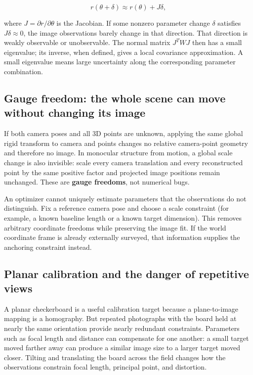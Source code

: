 \[
r(\theta+\delta)\approx r(\theta)+J\delta,
\]

where \(J=\partial r/\partial\theta\) is the Jacobian. If some nonzero parameter change \(\delta\) satisfies \(J\delta\approx0\), the image observations barely change in that direction. That direction is weakly observable or unobservable. The normal matrix \(J^T W J\) then has a small eigenvalue; its inverse, when defined, gives a local covariance approximation. A small eigenvalue means large uncertainty along the corresponding parameter combination.

\subsection{Gauge freedom: the whole scene can move without changing its image}\label{02-foundations-ii-ch036-gauge-freedom-the-whole-scene-can-move-without-changing-its-image}

\hypertarget{02-foundations-ii-ch036-gauge-freedom-the-whole-scene-can-move-without-changing-its-image}{}

If both camera poses and all 3D points are unknown, applying the same global rigid transform to camera and points changes no relative camera-point geometry and therefore no image. In monocular structure from motion, a global scale change is also invisible: scale every camera translation and every reconstructed point by the same positive factor and projected image positions remain unchanged. These are \textbf{gauge freedoms}, not numerical bugs.

An optimizer cannot uniquely estimate parameters that the observations do not distinguish. Fix a reference camera pose and choose a scale constraint (for example, a known baseline length or a known target dimension). This removes arbitrary coordinate freedoms while preserving the image fit. If the world coordinate frame is already externally surveyed, that information supplies the anchoring constraint instead.

\subsection{Planar calibration and the danger of repetitive views}\label{02-foundations-ii-ch036-planar-calibration-and-the-danger-of-repetitive-views}

\hypertarget{02-foundations-ii-ch036-planar-calibration-and-the-danger-of-repetitive-views}{}

A planar checkerboard is a useful calibration target because a plane-to-image mapping is a homography. But repeated photographs with the board held at nearly the same orientation provide nearly redundant constraints. Parameters such as focal length and distance can compensate for one another: a small target moved farther away can produce a similar image size to a larger target moved closer. Tilting and translating the board across the field changes how the observations constrain focal length, principal point, and distortion.

